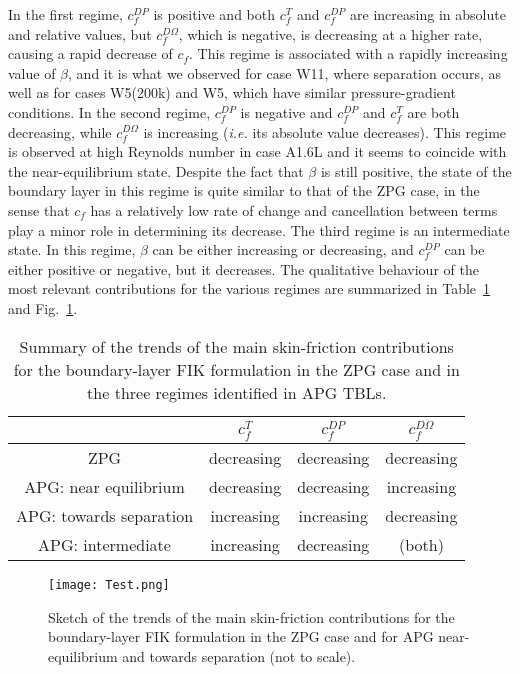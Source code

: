 In the first regime, $c^{DP}_f$ is positive and both $c^T_f$ and $c^{DP}_f$ are increasing in absolute and relative values, but $c^{D\Omega}_f$, which is negative, is decreasing at a higher rate, causing a rapid decrease of $c_f$. This regime is associated with a rapidly increasing value of $\beta$, and it is what we observed for case W11, where separation occurs, as well as for cases W5(200k) and W5, which have similar pressure-gradient conditions. In the second regime, $c^{DP}_f$ is negative and $c^{DP}_f$ and $c^{T}_f$ are both decreasing, while $c^{D\Omega}_f$ is increasing (\textit{i.e.} its absolute value decreases). This regime is observed at high Reynolds number in case A1.6L and it seems to coincide with the near-equilibrium state\cite{Bobke2017}. Despite the fact that $\beta$ is still positive, the state of the boundary layer in this regime is quite similar to that of the ZPG case, in the sense that $c_f$ has a relatively low rate of change and cancellation between terms play a minor role in determining its decrease. The third regime is an intermediate state. In this regime, $\beta$ can be either increasing or decreasing, and $c^{DP}_f$ can be either positive or negative, but it decreases. The qualitative behaviour of the most relevant contributions for the various regimes are summarized in Table~\ref{tab:regimes} and Fig.~\ref{fig:test}. 


\begin{table}
\caption{\label{tab:regimes}Summary of the trends of the main skin-friction contributions for the boundary-layer FIK formulation in the ZPG case and in the three regimes identified in APG TBLs.}
\centering
\begin{tabular}{cccc}
\hline \hline
 & $c^T_f$ & $c^{DP}_f$ & $c^{D\Omega}_f$\\ \hline
ZPG & decreasing & decreasing & decreasing \\
APG: near equilibrium & decreasing & decreasing & increasing \\
APG: towards separation & increasing & increasing & decreasing \\
APG: intermediate & increasing & decreasing & (both) \\
\hline \hline
\end{tabular}
%  
\end{table}


\begin{figure}
\centering
\texttt{[image: Test.png]}
\caption{\label{fig:test} Sketch of the trends of the main skin-friction contributions for the boundary-layer FIK formulation in the ZPG case and for APG near-equilibrium and towards separation (not to scale). }
\end{figure}


